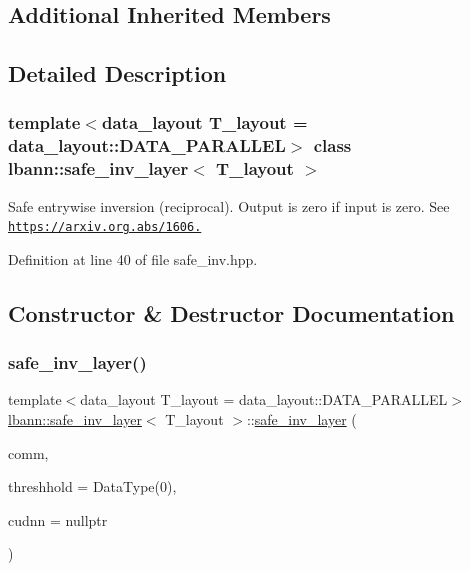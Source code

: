 \subsection*{Additional Inherited Members}


\subsection{Detailed Description}
\subsubsection*{template$<$data\+\_\+layout T\+\_\+layout = data\+\_\+layout\+::\+D\+A\+T\+A\+\_\+\+P\+A\+R\+A\+L\+L\+EL$>$\newline
class lbann\+::safe\+\_\+inv\+\_\+layer$<$ T\+\_\+layout $>$}

Safe entrywise inversion (reciprocal). Output is zero if input is zero. See \href{https://arxiv.org.abs/1606.06582}{\tt https\+://arxiv.\+org.\+abs/1606.} 

Definition at line 40 of file safe\+\_\+inv.\+hpp.



\subsection{Constructor \& Destructor Documentation}
\mbox{\label{classlbann_1_1safe__inv__layer_a8568b80fcabd1427eaa4b4deed294f5e}} 
\subsubsection{\texorpdfstring{safe\+\_\+inv\+\_\+layer()}{safe\_inv\_layer()}}
{\footnotesize\ttfamily template$<$data\+\_\+layout T\+\_\+layout = data\+\_\+layout\+::\+D\+A\+T\+A\+\_\+\+P\+A\+R\+A\+L\+L\+EL$>$ \\
\hyperlink{classlbann_1_1safe__inv__layer}{lbann\+::safe\+\_\+inv\+\_\+layer}$<$ T\+\_\+layout $>$\+::\hyperlink{classlbann_1_1safe__inv__layer}{safe\+\_\+inv\+\_\+layer} (\begin{DoxyParamCaption}\item[{\hyperlink{classlbann_1_1lbann__comm}{lbann\+\_\+comm} $\ast$}]{comm,  }\item[{Data\+Type}]{threshhold = {\ttfamily DataType(0)},  }\item[{\hyperlink{classlbann_1_1cudnn_1_1cudnn__manager}{cudnn\+::cudnn\+\_\+manager} $\ast$}]{cudnn = {\ttfamily nullptr} }\end{DoxyParamCaption})\hspace{0.3cm}{\ttfamily [inline]}}




